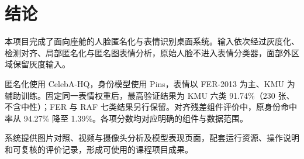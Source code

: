 \section{结论}
\label{sec:conclusion}
本项目完成了面向座舱的人脸匿名化与表情识别桌面系统。输入依次经过灰度化、检测对齐、局部匿名化与匿名图表情分析，原始人脸不进入表情分类器，面部外区域保留灰度输入。

匿名化使用 CelebA-HQ，身份模型使用 Pins，表情以 FER-2013 为主、KMU 为辅助训练。固定同一表情权重后，最高验证结果为 KMU 六类 91.74\%（230 张、不含中性）；FER 与 RAF 七类结果另行保留。对齐残差组件评价中，原身份命中率从 94.27\% 降至 1.39\%。各项分数均对应明确的组件与数据范围。

系统提供图片对照、视频与摄像头分析及模型表现页面，配套运行资源、操作说明和可复核的评价记录，形成可使用的课程项目成果。
